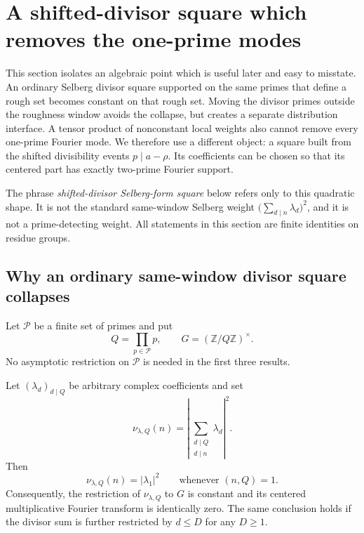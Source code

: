 \section{A shifted-divisor square which removes the one-prime modes}
\label{sec:shifted-square-design}

This section isolates an algebraic point which is useful later and easy to
misstate.  An ordinary Selberg divisor square supported on the same primes
that define a rough set becomes constant on that rough set.  Moving the
divisor primes outside the roughness window avoids the collapse, but creates
a separate distribution interface.  A tensor product of nonconstant local
weights also cannot remove every one-prime Fourier mode.  We therefore use a
different object: a square built from the shifted divisibility events
$p\mid a-\rho$.  Its coefficients can be chosen so that its centered part has
exactly two-prime Fourier support.

The phrase \emph{shifted-divisor Selberg-form square} below refers only to
this quadratic shape.  It is not the standard same-window Selberg weight
$\bigl(\sum_{d\mid n}\lambda_d\bigr)^2$, and it is not a prime-detecting
weight.  All statements in this section are finite identities on residue
groups.

\subsection{Why an ordinary same-window divisor square collapses}
\label{subsec:same-window-collapse}

Let $\mathcal P$ be a finite set of primes and put
\begin{equation}
 Q=\prod_{p\in\mathcal P}p,
 \qquad
 G=(\mathbb Z/Q\mathbb Z)^\times.
 \label{eq:wt-Q-and-G}
\end{equation}
No asymptotic restriction on $\mathcal P$ is needed in the first three
results.

\begin{proposition}
\label{prop:wt-same-window-collapse}
Let $(\lambda_d)_{d\mid Q}$ be arbitrary complex coefficients and set
\begin{equation}
 \nu_{\lambda,Q}(n)
 =\left|\sum_{\substack{d\mid Q\\d\mid n}}\lambda_d\right|^2.
 \label{eq:wt-ordinary-selberg-square}
\end{equation}
Then
\begin{equation}
 \nu_{\lambda,Q}(n)=|\lambda_1|^2
 \qquad\text{whenever }(n,Q)=1.
 \label{eq:wt-collapse-identity}
\end{equation}
Consequently, the restriction of $\nu_{\lambda,Q}$ to $G$ is constant and
its centered multiplicative Fourier transform is identically zero.  The
same conclusion holds if the divisor sum is further restricted by $d\le D$
for any $D\ge1$.
\end{proposition}


